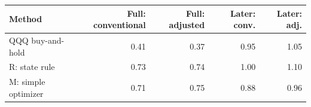 \begin{tabular}{@{}lrrrr@{}}\toprule
Method & Full: conventional & Full: adjusted & Later: conv. & Later: adj.\\\midrule
QQQ buy-and-hold & 0.41 & 0.37 & 0.95 & 1.05\\
R: state rule & 0.73 & 0.74 & 1.00 & 1.10\\
M: simple optimizer & 0.71 & 0.75 & 0.88 & 0.96\\
\bottomrule
\end{tabular}
